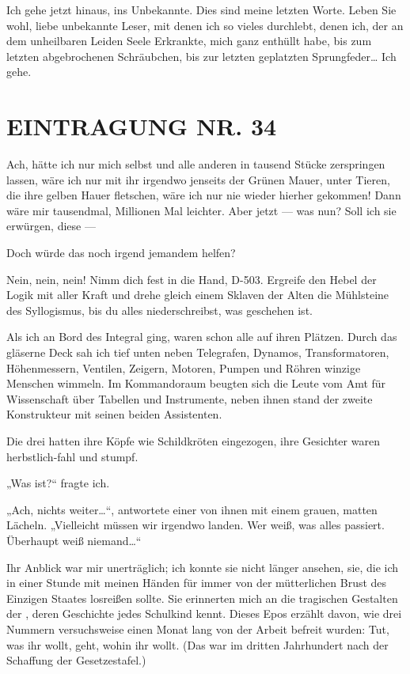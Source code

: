 Ich gehe jetzt hinaus, ins Unbekannte. Dies sind meine letzten
Worte. Leben Sie wohl, liebe unbekannte Leser, mit denen ich so
vieles durchlebt, denen ich, der an dem unheilbaren Leiden Seele
Erkrankte, mich ganz enthüllt habe, bis zum letzten abgebrochenen
Schräubchen, bis zur letzten geplatzten Sprungfeder\ldots{} Ich gehe.

\section{EINTRAGUNG NR. 34}

Ach, hätte ich nur mich selbst und alle anderen in tausend Stücke
zerspringen lassen, wäre ich nur mit ihr irgendwo jenseits der
Grünen Mauer, unter Tieren, die ihre gelben Hauer fletschen, wäre
ich nur nie wieder hierher gekommen! Dann wäre mir tausendmal,
Millionen Mal leichter. Aber jetzt — was nun? Soll ich sie
erwürgen, diese —

Doch würde das noch irgend jemandem helfen?

Nein,
nein, nein! Nimm dich fest in die Hand, D-503. Ergreife den Hebel
der Logik mit aller Kraft und drehe gleich einem Sklaven der Alten
die Mühlsteine des Syllogismus, bis du alles niederschreibst, was
geschehen ist.

Als ich an Bord des Integral ging, waren schon alle auf ihren
Plätzen. Durch das gläserne Deck sah ich tief unten neben
Telegrafen, Dynamos, Transformatoren, Höhenmessern, Ventilen,
Zeigern, Motoren, Pumpen und Röhren winzige Menschen wimmeln. Im
Kommandoraum beugten sich die Leute vom Amt für Wissenschaft über
Tabellen und Instrumente, neben ihnen stand der zweite Konstrukteur
mit seinen beiden Assistenten.

Die drei hatten ihre Köpfe wie Schildkröten eingezogen, ihre
Gesichter waren herbstlich-fahl und stumpf.

„Was ist?“ fragte ich.

„Ach, nichts weiter\ldots{}“, antwortete einer von ihnen mit einem
grauen, matten Lächeln. „Vielleicht müssen wir irgendwo landen. Wer
weiß, was alles passiert. Überhaupt weiß niemand\ldots{}“

Ihr Anblick war mir unerträglich; ich konnte sie nicht länger
ansehen, sie, die ich in einer Stunde mit meinen Händen für immer
von der mütterlichen Brust des Einzigen Staates losreißen sollte.
Sie erinnerten mich an die tragischen Gestalten der ,
deren Geschichte jedes Schulkind kennt. Dieses Epos erzählt davon,
wie drei Nummern versuchsweise einen Monat lang von der Arbeit
befreit wurden: Tut, was ihr wollt, geht, wohin ihr wollt. (Das war
im dritten Jahrhundert nach der Schaffung der Gesetzestafel.)

